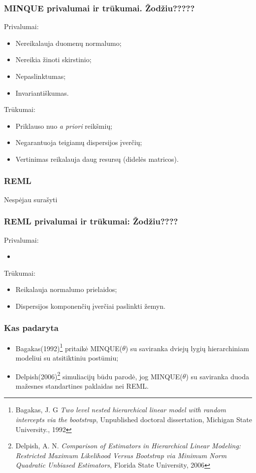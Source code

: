 \documentclass[utf8,hyperref={unicode,pdftex}]{beamer}
\begin{document}
\begin{frame}
\frametitle{MINQUE privalumai ir trūkumai. Žodžiu?????}
Privalumai:
\begin{itemize}
\item Nereikalauja duomenų normalumo;
\item Nereikia žinoti skirstinio;
\item Nepaslinktumas;
\item Invariantiškumas.
\end{itemize}
Trūkumai:
\begin{itemize}
\item Priklauso nuo \textit{a priori} reikšmių;
\item Negarantuoja teigiamų dispersijos įverčių;
\item Vertinimas reikalauja daug resursų (didelės matricos).
\end{itemize}
\end{frame}
\begin{frame}
\frametitle{REML}
Nespėjau surašyti
\end{frame}

\begin{frame}
\frametitle{REML privalumai ir trūkumai: Žodžiu????}
Privalumai:
\begin{itemize}
\item
\end{itemize}
Trūkumai:
\begin{itemize}
\item Reikalauja normalumo prielaidos;
\item Dispersijos komponenčių įverčiai paslinkti žemyn.
\end{itemize}
\end{frame}
\begin{frame}
\frametitle{Kas padaryta}
\begin{itemize}
\item Bagakas(1992)\footnote{Bagakas, J. G  \textit{ Two level nested hierarchical linear model with random intercepts
via the bootstrap}, Unpublished doctoral dissertation, Michigan State University., 1992} pritaikė MINQUE($\theta$) su saviranka dviejų lygių hierarchiniam modeliui su atsitiktiniu postūmiu;
\item Delpish(2006)\footnote{Delpish, A. N.  \textit{Comparison of Estimators in Hierarchical Linear Modeling: Restricted Maximum Likelihood Versus Bootstrap via Minimum Norm Quadratic Unbiased Estimators}, Florida State University, 2006} simuliacijų būdu parodė, jog MINQUE($\theta$) su saviranka duoda mažesnes standartines paklaidas nei REML.
\end{itemize}
\end{frame}
\end{document}
